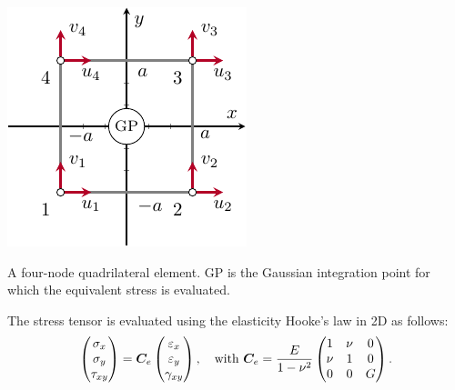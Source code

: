 \begin{marginfigure}
    \centering
    \includegraphics{figures/03_comparison_TO_TTO/02_gauss_point/gp.pdf}
    \caption{A four-node quadrilateral element. GP is the Gaussian integration point for which the equivalent stress is evaluated.}
    \label{fig:03_gp}
\end{marginfigure}


The stress tensor is evaluated using the elasticity Hooke's law in 2D as follows: 
\begin{equation}
    \begin{pmatrix}
    \sigma_x \\
    \sigma_y \\
    \tau_{xy}
    \end{pmatrix}
    =\bm{C}_e
    \begin{pmatrix}
    \varepsilon_x \\
    \varepsilon_y \\
    \gamma_{xy}
    \end{pmatrix}, \quad
    \textrm{with }
    \bm{C}_e = \frac{E}{1-\nu^2}
    \begin{pmatrix}
    1   &   \nu &   0   \\
    \nu &   1   &   0   \\
    0   &   0   &   G
    \end{pmatrix}.
\end{equation}

